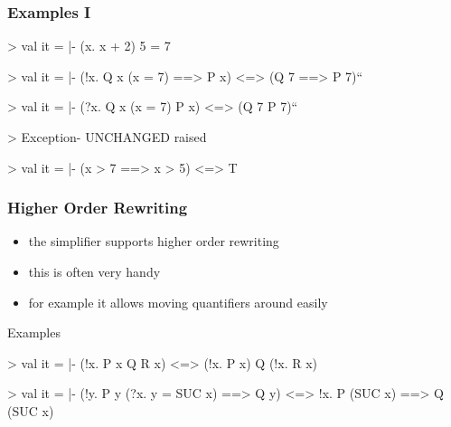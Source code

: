 \begin{frame}[fragile]
\frametitle{Examples I}
\begin{semiverbatim}\scriptsize
>  
val it = |- (\textbsl{}x. x + 2) 5 = 7

>  
val it = |- (!x. Q x \holAnd{} (x = 7) ==> P x) <=> (Q 7 ==> P 7)``

>  
val it = |- (?x. Q x \holAnd{} (x = 7) \holAnd{} P x) <=> (Q 7 \holAnd{} P 7)``

>  
Exception- UNCHANGED raised

>  
val it = |- (x > 7 ==> x > 5) <=> T
\end{semiverbatim}
\end{frame}


\begin{frame}[fragile]
\frametitle{Higher Order Rewriting}

\begin{itemize}
\item the simplifier supports higher order rewriting
\item this is often very handy
\item for example it allows moving quantifiers around easily
\end{itemize}

\begin{exampleblock}{Examples}
\begin{semiverbatim}\scriptsize
>  
val it = |- (!x. P x \holAnd{} Q \holAnd{} R x) <=> 
            (!x. P x) \holAnd{} Q \holAnd{} (!x. R x)

>  
val it = |- (!y. P y \holAnd{} (?x. y = SUC x) ==> Q y) <=> 
            !x. P (SUC x) ==> Q (SUC x)
\end{semiverbatim}
\end{exampleblock}
\end{frame}



